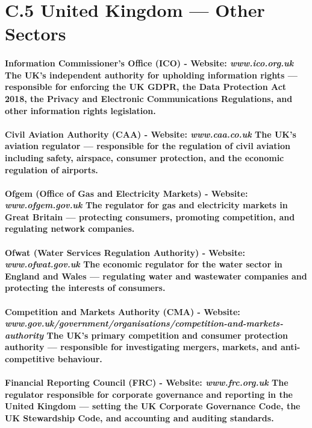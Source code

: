 \section*{C.5 United Kingdom — Other Sectors}
\paragraph{\textbf{Information Commissioner's Office (ICO)} - Website: \textit{www.ico.org.uk} The UK's independent authority for upholding information rights — responsible for enforcing the UK GDPR, the Data Protection Act 2018, the Privacy and Electronic Communications Regulations, and other information rights legislation.}
\paragraph{\textbf{Civil Aviation Authority (CAA)} - Website: \textit{www.caa.co.uk} The UK's aviation regulator — responsible for the regulation of civil aviation including safety, airspace, consumer protection, and the economic regulation of airports.}
\paragraph{\textbf{Ofgem (Office of Gas and Electricity Markets)} - Website: \textit{www.ofgem.gov.uk} The regulator for gas and electricity markets in Great Britain — protecting consumers, promoting competition, and regulating network companies.}
\paragraph{\textbf{Ofwat (Water Services Regulation Authority)} - Website: \textit{www.ofwat.gov.uk} The economic regulator for the water sector in England and Wales — regulating water and wastewater companies and protecting the interests of consumers.}
\paragraph{\textbf{Competition and Markets Authority (CMA)} - Website: \textit{www.gov.uk/government/organisations/competition-and-markets-authority} The UK's primary competition and consumer protection authority — responsible for investigating mergers, markets, and anti-competitive behaviour.}
\paragraph{\textbf{Financial Reporting Council (FRC)} - Website: \textit{www.frc.org.uk} The regulator responsible for corporate governance and reporting in the United Kingdom — setting the UK Corporate Governance Code, the UK Stewardship Code, and accounting and auditing standards.}
